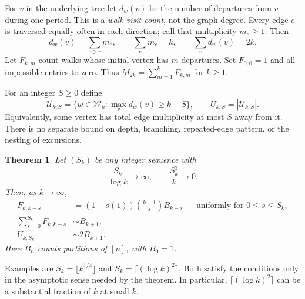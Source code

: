 \documentclass[11pt,letterpaper]{article}
\newtheorem{theorem}{Theorem}[section]
\theoremstyle{remark}\newtheorem{remark}[theorem]{Remark}
\newcommand{\Wc}{\mathcal W}\newcommand{\Uc}{\mathcal U}\newcommand{\Part}{\operatorname{Part}}
\theoremstyle{definition}\newtheorem{definition}[theorem]{Definition}
\begin{document}
For $v$ in the underlying tree let $d_w(v)$ be the number of departures from $v$ during one period. This is a \emph{walk visit count}, not the graph degree. Every edge $e$ is traversed equally often in each direction; call that multiplicity $m_e\ge1$. Then
\begin{equation}\label{sgm:dv:eq:visits}
 d_w(v)=\sum_{e\ni v}m_e,\qquad \sum_e m_e=k,\qquad \sum_v d_w(v)=2k.
\end{equation}
Let $F_{k,m}$ count walks whose initial vertex has $m$ departures. Set $F_{0,0}=1$ and all impossible entries to zero. Thus $M_{2k}=\sum_{m=1}^kF_{k,m}$ for $k\ge1$.

For an integer $S\ge0$ define
\[
 \Uc_{k,S}=\{w\in\Wc_k:\max_v d_w(v)\ge k-S\},\qquad U_{k,S}=|\Uc_{k,S}|.
\]
Equivalently, some vertex has total edge multiplicity at most $S$ away from it. There is no separate bound on depth, branching, repeated-edge pattern, or the nesting of excursions.

\begin{theorem}\label{sgm:dv:thm:main}
Let $(S_k)$ be any integer sequence with
\begin{equation}\label{sgm:dv:eq:window}
 \frac{S_k}{\log k}\longrightarrow\infty,
 \qquad \frac{S_k^3}{k}\longrightarrow0.
\end{equation}
Then, as $k\to\infty$,
\begin{align}
 F_{k,k-s}&=(1+o(1))\binom{k-1}{s}B_{k-s}
 &&\text{uniformly for }0\le s\le S_k,\label{sgm:dv:eq:uniform}\\
 \sum_{s=0}^{S_k}F_{k,k-s}&\sim B_{k+1},\label{sgm:dv:eq:rootmain}\\
 U_{k,S_k}&\sim2B_{k+1}.\label{sgm:dv:eq:unionmain}
\end{align}
Here $B_n$ counts partitions of $[n]$, with $B_0=1$.
\end{theorem}
Examples are $S_k=\lfloor k^{1/4}\rfloor$ and $S_k=\lceil(\log k)^2\rceil$. Both satisfy the conditions only in the asymptotic sense needed by the theorem. In particular, $\lceil(\log k)^2\rceil$ can be a substantial fraction of $k$ at small $k$.
\end{document}
